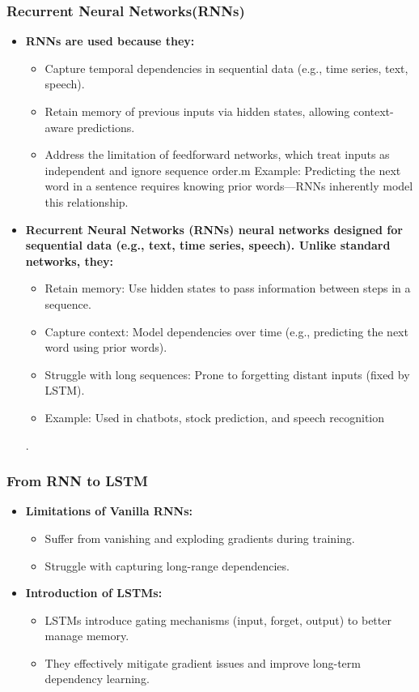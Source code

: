 \documentclass{beamer}
\begin{document}
\begin{frame}
\frametitle{Recurrent Neural Networks(RNNs)}
\begin{itemize}
    \item \textbf{RNNs are used because they:}
    \begin{itemize}
        \item Capture temporal dependencies in sequential data (e.g., time series, text, speech).
        \item Retain memory of previous inputs via hidden states, allowing context-aware predictions.
    \ite\item Address the limitation of feedforward networks, which treat inputs as independent and ignore sequence order.m Example: Predicting the next word in a sentence requires knowing prior words—RNNs inherently model this relationship.    
    \end{itemize}
    \item \textbf{Recurrent Neural Networks (RNNs) neural networks designed for sequential data (e.g., text, time series, speech). Unlike standard networks, they:}
    \begin{itemize}
        \item Retain memory: Use hidden states to pass information between steps in a sequence.
        \item Capture context: Model dependencies over time (e.g., predicting the next word using prior words).
        \item Struggle with long sequences: Prone to forgetting distant inputs (fixed by LSTM).
        \item Example: Used in chatbots, stock prediction, and speech recognition 
    \end{itemize}
    .
\end{itemize}
\end{frame}

\begin{frame}
\frametitle{From RNN to LSTM}
\begin{itemize}
    \item \textbf{Limitations of Vanilla RNNs:}
    \begin{itemize}
        \item Suffer from vanishing and exploding gradients during training.
        \item Struggle with capturing long-range dependencies.
    \end{itemize}
    \item \textbf{Introduction of LSTMs:}
    \begin{itemize}
        \item LSTMs introduce gating mechanisms (input, forget, output) to better manage memory.
        \item They effectively mitigate gradient issues and improve long-term dependency learning.
    \end{itemize}
\end{itemize}
\end{frame}
\end{document}
